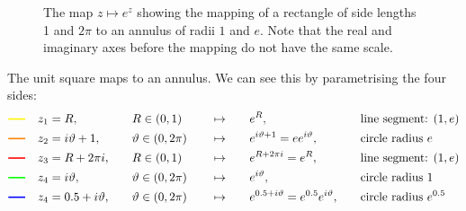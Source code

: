 \documentclass{article}
\begin{document}
\begin{figure}[ht]
        \tikzexternaldisable
        \caption{The map \(z\mapsto e^z\) showing the mapping of a rectangle of side lengths 1 and \(2\pi\) to an annulus of radii \(1\) and \(e\). Note that the real and imaginary axes before the mapping do not have the same scale.}
        \label{fig:exponential conformal map}
    \end{figure}
    The unit square maps to an annulus.
    We can see this by parametrising the four sides:
    \tikzexternaldisable
    \begin{alignat*}{5}
        \tikz[baseline={-0.1cm}]{\draw[very thick, yellow] (0, 0) -- (0.5, 0)}\quad z_1 &= R, \quad && R\in (0, 1) \quad && \mapsto\quad && e^R, \quad && \text{line segment: }(1, e)\\
        \tikz[baseline={-0.1cm}]{\draw[very thick, orange] (0, 0) -- (0.5, 0)}\quad z_2 &= i\vartheta + 1, \quad && \vartheta\in(0, 2\pi) \quad && \mapsto\quad && e^{i\vartheta + 1} = ee^{i\vartheta}, \quad && \text{circle radius }e\\
        \tikz[baseline={-0.1cm}]{\draw[very thick, red] (0, 0) -- (0.5, 0)}\quad z_3 &= R + 2\pi i, \quad && R\in (0, 1) \quad && \mapsto\quad && e^{R + 2\pi i} = e^R, \quad && \text{line segment: }(1, e)\\
        \tikz[baseline={-0.1cm}]{\draw[very thick, green] (0, 0) -- (0.5, 0)}\quad z_4 &= i\vartheta, \quad && \vartheta\in(0, 2\pi) \quad && \mapsto\quad && e^{i\vartheta}, \quad &&\text{circle radius }1\\
        \tikz[baseline={-0.1cm}]{\draw[very thick, blue] (0, 0) -- (0.5, 0)}\quad z_4 &= 0.5 + i\vartheta, \quad && \vartheta\in(0, 2\pi) \quad && \mapsto\quad && e^{0.5 + i\vartheta} = e^{0.5}e^{i\vartheta}, \quad && \text{circle radius }e^{0.5}\\
    \end{alignat*}
    
\end{document}
